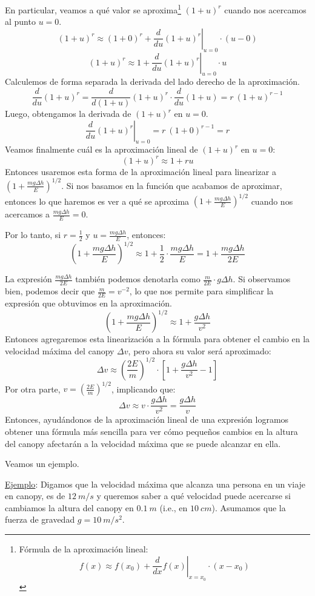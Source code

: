 \documentclass[12pt]{article}
\begin{document}
En particular, veamos a qué valor se aproxima\footnote{Fórmula de la aproximación lineal: \[f(x) \approx f(x_{0}) + \left.\frac{d}{dx} f(x) \right|_{x = x_{0}} \cdot (x - x_{0})\]} $(1 + u)^{r}$ cuando nos acercamos al punto $u = 0$.
\[(1 + u)^{r} \approx (1 + 0)^{r} + \left.\frac{d}{du} (1 + u)^{r} \right|_{u = 0} \cdot (u - 0)\]
\[(1 + u)^{r} \approx 1 + \left.\frac{d}{du} (1 + u)^{r} \right|_{u = 0} \cdot u\]
Calculemos de forma separada la derivada del lado derecho de la aproximación.
\[\frac{d}{du} (1 + u)^{r} = \frac{d}{d(1 + u)} (1 + u)^{r} \cdot \frac{d}{du} (1 + u) = r \ (1 + u)^{r - 1}\]
Luego, obtengamos la derivada de $(1 + u)^{r}$ en $u = 0$.
\[\left.\frac{d}{du} (1 + u)^{r} \right|_{u = 0} = r \ (1 + 0)^{r - 1} = r\]
Veamos finalmente cuál es la aproximación lineal de $(1 + u)^{r}$ en $u = 0$:
\[(1 + u)^{r} \approx 1 + ru\]
Entonces usaremos esta forma de la aproximación lineal para linearizar a $\left(1 + \frac{mg \Delta h}{E}\right)^{1/2}$. Si nos basamos en la función que acabamos de aproximar, entonces lo que haremos es ver a qué se aproxima $\left(1 + \frac{mg \Delta h}{E}\right)^{1/2}$ cuando nos acercamos a $\frac{mg \Delta h}{E} = 0$.

Por lo tanto, si $r = \frac{1}{2}$ y $u = \frac{mg \Delta h}{E}$, entonces:
\[\left(1 + \frac{mg \Delta h}{E}\right)^{1/2} \approx 1 + \frac{1}{2} \cdot \frac{mg \Delta h}{E} = 1 + \frac{mg \Delta h}{2E}\]

\newpage

La expresión $\frac{mg \Delta h}{2E}$ también podemos denotarla como $\frac{m}{2E} \cdot g \Delta h$. Si observamos bien, podemos decir que $\frac{m}{2E} = v^{-2}$, lo que nos permite para simplificar la expresión que obtuvimos en la aproximación.
\[\left(1 + \frac{mg \Delta h}{E}\right)^{1/2} \approx 1 + \frac{g \Delta h}{v^{2}}\]
Entonces agregaremos esta linearización a la fórmula para obtener el cambio en la velocidad máxima del canopy $\Delta v$, pero ahora su valor será aproximado:
\[\Delta v \approx \left(\frac{2E}{m}\right)^{1/2} \cdot \left[1 + \frac{g \Delta h}{v^{2}} - 1 \right]\]
Por otra parte, $v = \left(\frac{2E}{m}\right)^{1/2}$, implicando que:
\[\Delta v \approx v \cdot \frac{g \Delta h}{v^{2}} = \frac{g \Delta h}{v}\]
Entonces, ayudándonos de la aproximación lineal de una expresión logramos obtener una fórmula más sencilla para ver cómo pequeños cambios en la altura del canopy afectarán a la velocidad máxima que se puede alcanzar en ella.

Veamos un ejemplo.

\underline{Ejemplo}: Digamos que la velocidad máxima que alcanza una persona en un viaje en canopy, es de $12 \ m/s$ y queremos saber a qué velocidad puede acercarse si cambiamos la altura del canopy en $0.1 \ m$ (i.e., en $10 \ cm$). Asumamos que la fuerza de gravedad $g = 10 \ m/s^{2}$.
\end{document}

